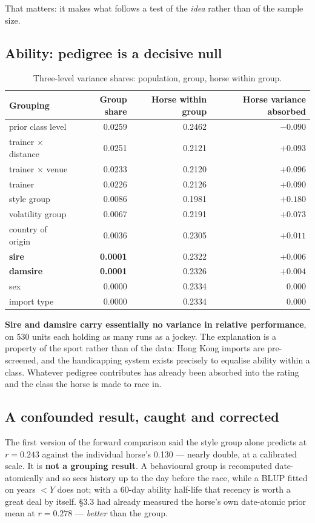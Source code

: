 \documentclass[11pt,a4paper]{article}
\newcommand{\bad}[1]{\textcolor{warm}{\textbf{#1}}}
\begin{document}
That matters: it makes what follows a test of the \emph{idea} rather than of the
sample size.

\subsection{Ability: pedigree is a decisive null}

\begin{table}[htbp]\centering\small
\caption{Three-level variance shares: population, group, horse within group.}
\begin{tabular}{lrrr}
\toprule
Grouping & Group share & Horse within group & Horse variance absorbed\\
\midrule
prior class level & 0.0259 & 0.2462 & $-0.090$\\
trainer $\times$ distance & 0.0251 & 0.2121 & $+0.093$\\
trainer $\times$ venue & 0.0233 & 0.2120 & $+0.096$\\
trainer & 0.0226 & 0.2126 & $+0.090$\\
style group & 0.0086 & 0.1981 & $+0.180$\\
volatility group & 0.0067 & 0.2191 & $+0.073$\\
country of origin & 0.0036 & 0.2305 & $+0.011$\\
\textbf{sire} & \bad{0.0001} & 0.2322 & $+0.006$\\
\textbf{damsire} & \bad{0.0001} & 0.2326 & $+0.004$\\
sex & 0.0000 & 0.2334 & 0.000\\
import type & 0.0000 & 0.2334 & 0.000\\
\bottomrule
\end{tabular}
\end{table}

\textbf{Sire and damsire carry essentially no variance in relative performance},
on 530 units each holding as many runs as a jockey. The explanation is a property
of the sport rather than of the data: Hong Kong imports are pre-screened, and the
handicapping system exists precisely to equalise ability within a class. Whatever
pedigree contributes has already been absorbed into the rating and the class the
horse is made to race in.

\subsection{A confounded result, caught and corrected}

The first version of the forward comparison said the style group alone predicts at
$r=0.243$ against the individual horse's 0.130 --- nearly double, at a calibrated
scale. It is \textbf{not a grouping result}. A behavioural group is recomputed
date-atomically and so sees history up to the day before the race, while a BLUP
fitted on years $<Y$ does not; with a 60-day ability half-life that recency is
worth a great deal by itself. \S3.3 had already measured the horse's own
date-atomic prior mean at $r=0.278$ --- \emph{better} than the group.
\end{document}
